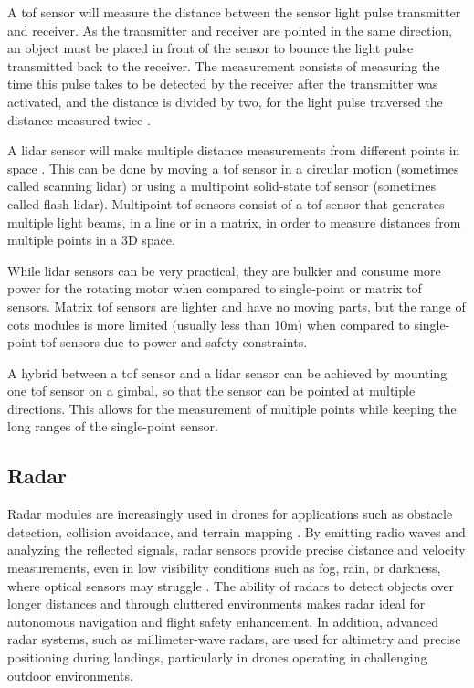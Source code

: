 A \gls{tof} sensor will measure the distance between the sensor light pulse transmitter and receiver.
As the transmitter and receiver are pointed in the same direction, an object must be placed in front of
the sensor to bounce the light pulse transmitted back to the receiver. The measurement consists of measuring
the time this pulse takes to be detected by the receiver after the transmitter was activated, and the distance
is divided by two, for the light pulse traversed the distance measured twice \cite{lidar2}.

A \gls{lidar} sensor will make multiple distance measurements from different points in space \cite{lidar1}. This
can be done by moving a \gls{tof} sensor in a circular motion (sometimes called scanning \gls{lidar}) or using
a multipoint solid-state \gls{tof} sensor (sometimes called flash \gls{lidar}). Multipoint \gls{tof} sensors
consist of a \gls{tof} sensor that generates multiple light beams, in a line or in a matrix, in order to measure
distances from multiple points in a 3D space.

While \gls{lidar} sensors can be very practical, they are bulkier and consume more power for the rotating
motor when compared to single-point or matrix \gls{tof} sensors. Matrix \gls{tof} sensors are lighter and have
no moving parts, but the range of \gls{cots} modules is more limited (usually less than 10m) when compared to
single-point \gls{tof} sensors \cite{dronelidar} due to power and safety constraints.

A hybrid between a \gls{tof} sensor and a \gls{lidar} sensor can be achieved by mounting one \gls{tof} sensor on
a gimbal, so that the sensor can be pointed at multiple directions. This allows for the measurement of multiple points
while keeping the long ranges of the single-point sensor.

\subsection{Radar}

Radar modules are increasingly used in drones for applications such as obstacle detection,
collision avoidance, and terrain mapping \cite{radaraltimetro2}. By emitting radio waves and
analyzing the reflected signals, radar sensors provide precise distance and velocity measurements,
even in low visibility conditions such as fog, rain, or darkness, where optical sensors may
struggle \cite{introtoradar}. The ability of radars to detect objects over longer distances and through
cluttered environments makes radar ideal for autonomous navigation and flight safety enhancement.
In addition, advanced radar systems, such as millimeter-wave radars, are used for altimetry and
precise positioning during landings, particularly in drones operating in challenging outdoor environments. 


